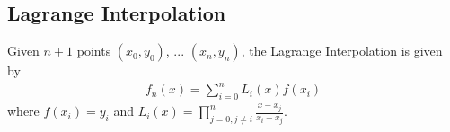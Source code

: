 \begin{appendices}
    \chapter{Lagrange Interpolation}
    Given $n+1$ points $(x_0, y_0)$, ... $(x_n, y_n)$, the Lagrange Interpolation is given by 
    \begin{align*}
        f_n(x) = \sum^{n}_{i=0} L_i(x)f(x_i)
    \end{align*}
    where $f(x_i) = y_i$ and $L_i(x)=\prod_{j=0,j\ne i}^{n}\frac{x-x_j}{x_i-x_j}$.
\end{appendices}